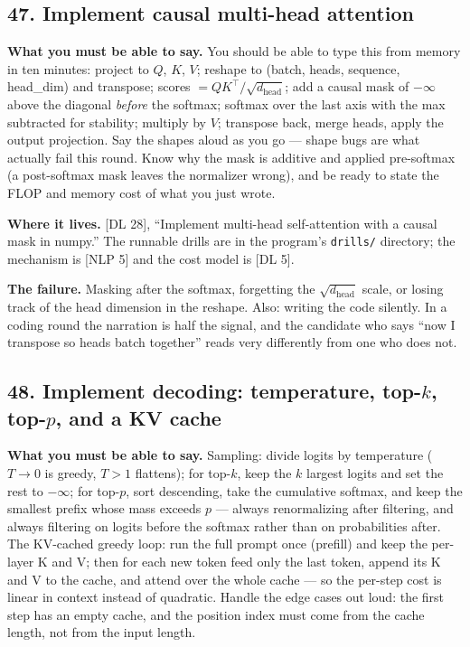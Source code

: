 \subsection*{47. Implement causal multi-head attention}

\textbf{What you must be able to say.} You should be able to type this from memory in ten minutes: project to $Q$, $K$, $V$; reshape to (batch, heads, sequence, head\_dim) and transpose; scores $= QK^{\top}/\sqrt{d_{\text{head}}}$; add a causal mask of $-\infty$ above the diagonal \emph{before} the softmax; softmax over the last axis with the max subtracted for stability; multiply by $V$; transpose back, merge heads, apply the output projection. Say the shapes aloud as you go --- shape bugs are what actually fail this round. Know why the mask is additive and applied pre-softmax (a post-softmax mask leaves the normalizer wrong), and be ready to state the FLOP and memory cost of what you just wrote.

\textbf{Where it lives.} [DL 28], ``Implement multi-head self-attention with a causal mask in numpy.'' The runnable drills are in the program's \texttt{drills/} directory; the mechanism is [NLP 5] and the cost model is [DL 5].

\textbf{The failure.} Masking after the softmax, forgetting the $\sqrt{d_{\text{head}}}$ scale, or losing track of the head dimension in the reshape. Also: writing the code silently. In a coding round the narration is half the signal, and the candidate who says ``now I transpose so heads batch together'' reads very differently from one who does not.

\subsection*{48. Implement decoding: temperature, top-$k$, top-$p$, and a KV cache}

\textbf{What you must be able to say.} Sampling: divide logits by temperature ($T \to 0$ is greedy, $T > 1$ flattens); for top-$k$, keep the $k$ largest logits and set the rest to $-\infty$; for top-$p$, sort descending, take the cumulative softmax, and keep the smallest prefix whose mass exceeds $p$ --- always renormalizing after filtering, and always filtering on logits before the softmax rather than on probabilities after. The KV-cached greedy loop: run the full prompt once (prefill) and keep the per-layer K and V; then for each new token feed only the last token, append its K and V to the cache, and attend over the whole cache --- so the per-step cost is linear in context instead of quadratic. Handle the edge cases out loud: the first step has an empty cache, and the position index must come from the cache length, not from the input length.

